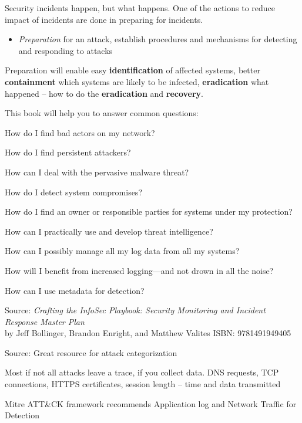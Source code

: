 \documentclass[Screen16to9,17pt]{foils}
\begin{document}


Security incidents happen, but what happens. One of the actions to reduce impact of incidents are done in preparing for incidents.

\begin{itemize}
\item \emph{Preparation} for an attack, establish procedures and mechanisms for detecting and responding to attacks
\end{itemize}

Preparation will enable easy {\bf identification} of affected systems, better {\bf containment} which systems are likely to be infected, {\bf eradication} what happened -- how to do the {\bf eradication} and {\bf recovery}.





This book will help you to answer common questions:
\begin{list2}
\item How do I find bad actors on my network?
\item How do I find persistent attackers?
\item How can I deal with the pervasive malware threat?
\item How do I detect system compromises?
\item How do I find an owner or responsible parties for systems under my protection?
\item How can I practically use and develop threat intelligence?
\item How can I possibly manage all my log data from all my systems?
\item How will I benefit from increased logging—and not drown in all the noise?
\item How can I use metadata for detection?
\end{list2}
Source: \emph{Crafting the InfoSec Playbook: Security Monitoring and Incident Response Master Plan}\\
 by Jeff Bollinger, Brandon Enright, and Matthew Valites ISBN: 9781491949405



Source:  Great resource for attack categorization

\begin{list2}
\item Most if not all attacks leave a trace, if you collect data. DNS requests, TCP connections, HTTPS certificates, session length -- time and data transmitted
\item Mitre ATT\&CK framework recommends Application log and Network Traffic for Detection
\end{list2}
\end{document}
